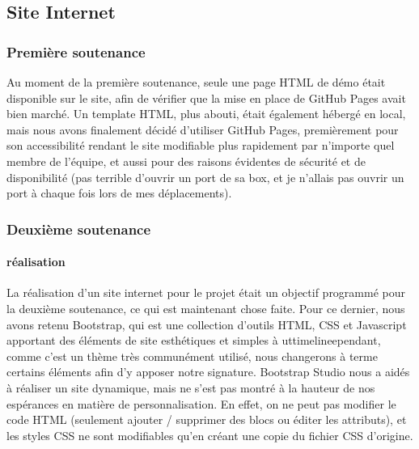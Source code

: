 \subsection{Site Internet}

    \vspace{0.5cm}
    \subsubsection{Première soutenance}
    \vspace{0.5cm}

        Au moment de la première soutenance, seule une page HTML de démo était disponible sur le site, afin de vérifier 
        que la mise en place de GitHub Pages avait bien marché. Un template HTML, plus abouti, était également hébergé en local, 
        mais nous avons finalement décidé d'utiliser GitHub Pages, premièrement pour son accessibilité rendant le site modifiable 
        plus rapidement par n'importe quel membre de l'équipe, et aussi pour des raisons évidentes de sécurité et de disponibilité 
        (pas terrible d'ouvrir un port de sa box, et je n'allais pas ouvrir un port à chaque fois lors de mes déplacements).


    \vspace{0.5cm}
    \subsubsection{Deuxième soutenance}
    \vspace{0.5cm}

        \paragraph{réalisation}

            La réalisation d'un site internet pour le projet était un objectif
            programmé pour la deuxième soutenance, ce qui est maintenant chose faite.
            Pour ce dernier, nous avons retenu Bootstrap, qui est une collection
            d'outils HTML, CSS et Javascript apportant des éléments de site
            esthétiques et simples à uttimelineependant, comme c'est un thème très 
            communément utilisé, nous changerons à terme certains éléments afin 
            d'y apposer notre signature. Bootstrap Studio nous a aidés à réaliser
            un site dynamique, mais ne s'est pas montré à la hauteur de nos espérances
            en matière de personnalisation. En effet, on ne peut pas modifier
            le code HTML (seulement ajouter / supprimer des blocs ou éditer les
            attributs), et les styles CSS ne sont modifiables qu'en créant une copie
            du fichier CSS d'origine.

